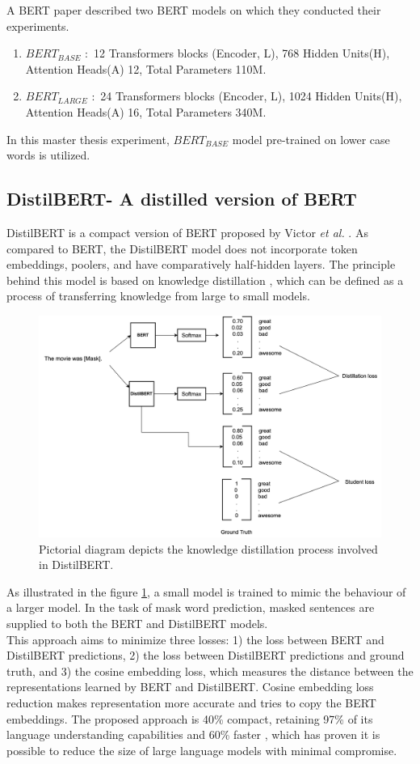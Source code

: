 \documentclass[%
	BCOR=8mm, %
	DIV=12,
	toc=bibliography, %
	toc=listof, %
	oneside, %
	egregdoesnotlikesansseriftitles, %
	]{scrbook}
\begin{document}
A BERT paper \cite{devlin_bert_2019-1} described two BERT models on which they conducted their experiments. 
\begin{enumerate}
    \item $BERT_{BASE}$ $:$ 12 Transformers blocks (Encoder, L), 768 Hidden Units(H), Attention Heads(A) 12, Total Parameters 110M.
    \item $BERT_{LARGE}$ $:$ 24 Transformers blocks (Encoder, L), 1024 Hidden Units(H), Attention Heads(A) 16, Total Parameters 340M.
\end{enumerate}
In this master thesis experiment, $BERT_{BASE}$ model pre-trained on lower case words is utilized. 

\subsection{DistilBERT- A distilled version of BERT}
DistilBERT is a compact version of BERT proposed by Victor \textit{et al.} \cite{sanh_distilbert_2020}. As compared to BERT, the DistilBERT model does not incorporate token embeddings, poolers, and have comparatively half-hidden layers. The principle behind this model is based on knowledge distillation \cite{hinton_distilling_2015}, which can be defined as a process of transferring knowledge from large  to small models. \\
\begin{figure}[H]
    \centering
    \includegraphics[width=0.90\linewidth]{img/DistilBERT.png}
    \caption[Diagram of DistilBERT training.]{ Pictorial diagram depicts the knowledge distillation process involved in  DistilBERT.}
    \label{fig:DistilBERT}
\end{figure}
As illustrated in the figure \ref{fig:DistilBERT}, a small model is trained to mimic the behaviour of a larger model. In the task of mask word prediction, masked sentences are supplied to both the BERT and DistilBERT models.\\
This approach aims to minimize three losses: 1) the loss between BERT and DistilBERT predictions, 2) the loss between DistilBERT predictions and ground truth, and 3) the cosine embedding loss, which measures the distance between the representations learned by BERT and DistilBERT. Cosine embedding loss reduction makes representation more accurate and tries to copy the BERT embeddings. The proposed approach is 40\% compact, retaining 97\% of its language understanding capabilities and 60\% faster \cite{sanh_distilbert_2020}, which has proven it is possible to reduce the size of large language models with minimal compromise.
\end{document}
